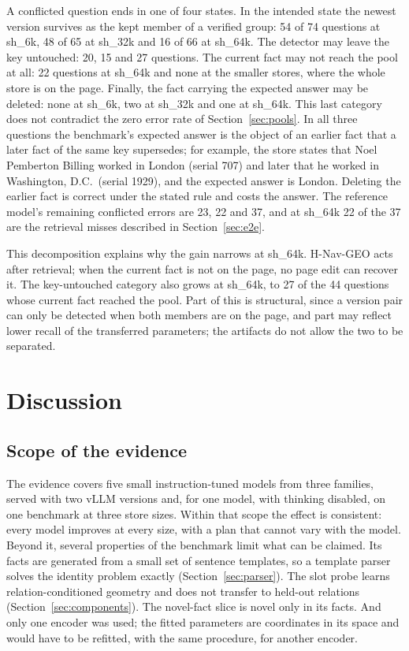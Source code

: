 \documentclass[journal=jcisd8,manuscript=article]{achemso}
\newcommand{\sub}[1]{\textsf{sh\_#1}}                    %
\newcommand{\geo}{H-Nav-GEO}
\begin{document}
A conflicted question ends in one of four states. In the intended state the newest version survives as the kept member of a verified group: 54 of 74 questions at \sub{6k}, 48 of 65 at \sub{32k} and 16 of 66 at \sub{64k}. The detector may leave the key untouched: 20, 15 and 27 questions. The current fact may not reach the pool at all: 22 questions at \sub{64k} and none at the smaller stores, where the whole store is on the page. Finally, the fact carrying the expected answer may be deleted: none at \sub{6k}, two at \sub{32k} and one at \sub{64k}. This last category does not contradict the zero error rate of Section~\ref{sec:pools}. In all three questions the benchmark's expected answer is the object of an earlier fact that a later fact of the same key supersedes; for example, the store states that Noel Pemberton Billing worked in London (serial 707) and later that he worked in Washington, D.C.\ (serial 1929), and the expected answer is London. Deleting the earlier fact is correct under the stated rule and costs the answer. The reference model's remaining conflicted errors are 23, 22 and 37, and at \sub{64k} 22 of the 37 are the retrieval misses described in Section~\ref{sec:e2e}.

This decomposition explains why the gain narrows at \sub{64k}. \geo{} acts after retrieval; when the current fact is not on the page, no page edit can recover it. The key-untouched category also grows at \sub{64k}, to 27 of the 44 questions whose current fact reached the pool. Part of this is structural, since a version pair can only be detected when both members are on the page, and part may reflect lower recall of the transferred parameters; the artifacts do not allow the two to be separated.

\section{Discussion}
\label{sec:discussion}

\subsection{Scope of the evidence}
\label{sec:scope}

The evidence covers five small instruction-tuned models from three families, served with two vLLM versions and, for one model, with thinking disabled, on one benchmark at three store sizes. Within that scope the effect is consistent: every model improves at every size, with a plan that cannot vary with the model. Beyond it, several properties of the benchmark limit what can be claimed. Its facts are generated from a small set of sentence templates, so a template parser solves the identity problem exactly (Section~\ref{sec:parser}). The slot probe learns relation-conditioned geometry and does not transfer to held-out relations (Section~\ref{sec:components}). The novel-fact slice is novel only in its facts. And only one encoder was used; the fitted parameters are coordinates in its space and would have to be refitted, with the same procedure, for another encoder.
\end{document}
